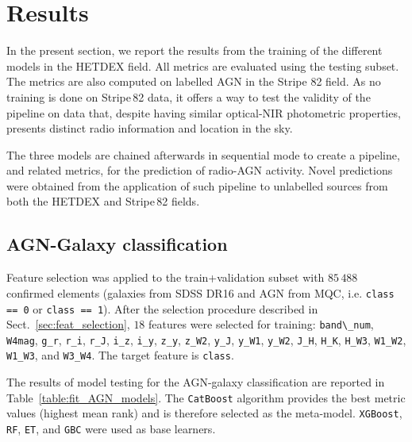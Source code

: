 \documentclass{aa}
\begin{document}

\section{Results}\label{sec:results}
In the present section, we report the results from the training of the different models in the HETDEX field. All metrics are evaluated using the testing subset. The metrics are also computed on labelled AGN in the Stripe 82 field. As no training is done on Stripe\,82 data, it offers a way to test the validity of the pipeline on data that, despite having similar optical-NIR photometric properties, presents distinct radio information and location in the sky.

The three models are chained afterwards in sequential mode to create a pipeline, and related metrics, for the prediction of radio-AGN activity. Novel predictions were obtained from the application of such pipeline to unlabelled sources from both the HETDEX and Stripe\,82 fields. 

\subsection{AGN-Galaxy classification}\label{sec:results_agn}
Feature selection was applied to the train+validation subset with $85\,488$ confirmed elements (galaxies from SDSS DR16 and AGN from MQC, i.e. \texttt{class == 0} or \texttt{class == 1}). After the selection procedure described in Sect.~\ref{sec:feat_selection}, $18$ features were selected for training: \verb|band\_num|, \verb|W4mag|, \verb|g_r|, \verb|r_i|, \verb|r_J|, \verb|i_z|, \verb|i_y|, \verb|z_y|, \verb|z_W2|, \verb|y_J|, \verb|y_W1|, \verb|y_W2|, \verb|J_H|, \verb|H_K|, \verb|H_W3|, \verb|W1_W2|, \verb|W1_W3|, and \verb|W3_W4|. The target feature is \verb|class|.

The results of model testing for the AGN-galaxy classification are reported in Table~\ref{table:fit_AGN_models}. The \verb|CatBoost| algorithm provides the best metric values (highest mean rank) and is therefore selected as the  meta-model. \verb|XGBoost|, \verb|RF|, \verb|ET|, and \verb|GBC| were used as base learners.
\end{document}
